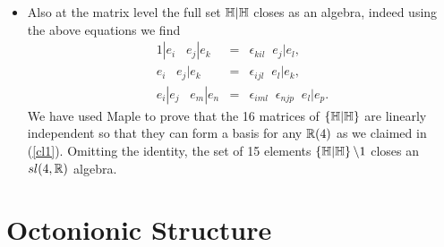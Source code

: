\documentclass[a4paper,12pt]{book}
\begin{document}
\begin{itemize}
\item  Also at the matrix level the full set $\Bbb{H}|\Bbb{H}$ closes as an
algebra, indeed using the above equations we find 
\begin{eqnarray}
1|e_{i}\;\;\;e_{j}|e_{k} &=&\epsilon _{kil}\;\;e_{j}|e_{l}, \\
e_{i}\;\;\;e_{j}|e_{k} &=&\epsilon _{ijl}\;\;e_{l}|e_{k}, \\
e_{i}|e_{j}\;\;\;e_{m}|e_{n} &=&\epsilon _{iml}\;\;\epsilon
_{njp}\;\;e_{l}|e_{p}.  \label{il5}
\end{eqnarray}
We have used Maple \cite{math} to prove that the 16 matrices of $\left\{ 
\Bbb{H}|\Bbb{H}\right\} $ are linearly independent so that they can form a
basis for any $\Bbb{R}(4)$ as we claimed in (\ref{cl1}). Omitting the
identity, the set of 15 elements $\left\{ \Bbb{H}|\Bbb{H}\right\} \backslash
1$ closes an $sl(4,\Bbb{R})$ algebra.
\end{itemize}

\newpage

\section{Octonionic Structure}
\end{document}
